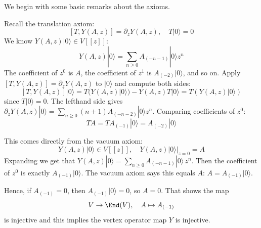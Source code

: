 \documentclass[12pt]{article}
\begin{document}
We begin with some basic remarks about the axioms.
\begin{remark}
    [$T$ is determined by $Y$] Recall the translation axiom:
    \[[T, Y(A,z)] = \partial_z Y(A,z), \quad T|0\rangle = 0\]
    We know $Y(A,z)|0\rangle \in V[[z]]$:
    \[Y(A,z)|0\rangle = \sum_{n\ge 0} A_{(-n-1)}|0\rangle z^n \]
    The coefficient of $z^0$ is $A$, the coefficient of $z^1$ is $A_{(-2)}|0\rangle$, and so on. Apply $[T,Y(A,z)] = \partial_z Y(A,z)$ to $|0\rangle$ and compute both sides:
    \[[T, Y(A,z)]|0\rangle = T(Y(A,z)|0\rangle) - Y(A,z)T|0\rangle = T(Y(A,z)|0\rangle)\]
    since $T|0\rangle=0$.
    The lefthand side gives
    $\partial_z Y(A,z)|0\rangle = \sum_{n\ge 0} (n+1)A_{(-n-2)}|0\rangle z^n$. Comparing coefficients of $z^0$:
    \[TA = T A_{(-1)}|0\rangle = A_{(-2)}|0\rangle\]
\end{remark}

\begin{remark}[$Y$ is injective]
    This comes directly from the vacuum axiom:
    \[Y(A,z)|0\rangle \in V[[z]], \quad Y(A,z)|0\rangle\big|_{z=0} = A\]
    Expanding we get that $Y(A,z)|0\rangle = \sum_{n\ge 0} A_{(-n-1)}|0\rangle\,z^n$.
    Then the coefficient of $z^0$ is exactly $A_{(-1)}|0\rangle$.
    The vacuum axiom says this equals $A$:
    $A = A_{(-1)}|0\rangle$.

    Hence, if $A_{(-1)} = 0$, then $A_{(-1)}|0\rangle = 0$, so $A=0$.
    That shows the map
    \[
        V \to \End(V), \quad A \mapsto A_{(-1)}
    \]
    is injective and this implies the vertex operator map $Y$ is injective.
\end{remark}
\end{document}
